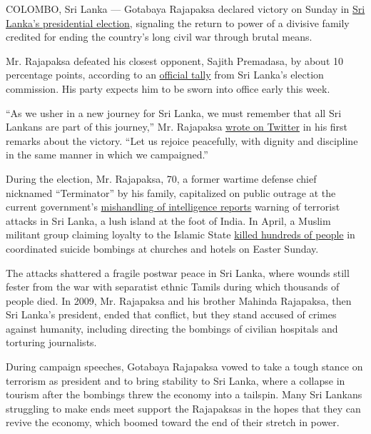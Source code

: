 COLOMBO, Sri Lanka --- Gotabaya Rajapaksa declared victory on Sunday in
\href{https://www.nytimes3xbfgragh.onion/2019/11/16/world/asia/sri-lanka-election-rajapaksa.html?rref=collection\%2Fbyline\%2Fkai-schultz\&action=click\&contentCollection=undefined\&region=stream\&module=stream_unit\&version=latest\&contentPlacement=1\&pgtype=collection}{Sri
Lanka's presidential election}, signaling the return to power of a
divisive family credited for ending the country's long civil war through
brutal means.

Mr. Rajapaksa defeated his closest opponent, Sajith Premadasa, by about
10 percentage points, according to an
\href{https://twitter.com/AzzamAmeen/status/1196016908446752768}{official
tally} from Sri Lanka's election commission. His party expects him to be
sworn into office early this week.

``As we usher in a new journey for Sri Lanka, we must remember that all
Sri Lankans are part of this journey,'' Mr. Rajapaksa
\href{https://twitter.com/GotabayaR/status/1195949575166521346}{wrote on
Twitter} in his first remarks about the victory. ``Let us rejoice
peacefully, with dignity and discipline in the same manner in which we
campaigned.''

During the election, Mr. Rajapaksa, 70, a former wartime defense chief
nicknamed ``Terminator'' by his family, capitalized on public outrage at
the current government's
\href{https://www.nytimes3xbfgragh.onion/2019/04/22/world/asia/ntj-warning-sri-lanka-government.html?action=click\&module=RelatedLinks\&pgtype=Article}{mishandling
of intelligence reports} warning of terrorist attacks in Sri Lanka, a
lush island at the foot of India. In April, a Muslim militant group
claiming loyalty to the Islamic State
\href{https://www.nytimes3xbfgragh.onion/2019/04/21/world/asia/sri-lanka-bombings.html?rref=collection\%2Fbyline\%2Fkai-schultz\&module=inline}{killed
hundreds of people} in coordinated suicide bombings at churches and
hotels on Easter Sunday.

The attacks shattered a fragile postwar peace in Sri Lanka, where wounds
still fester from the war with separatist ethnic Tamils during which
thousands of people died. In 2009, Mr. Rajapaksa and his brother Mahinda
Rajapaksa, then Sri Lanka's president, ended that conflict, but they
stand accused of crimes against humanity, including directing the
bombings of civilian hospitals and torturing journalists.

During campaign speeches, Gotabaya Rajapaksa vowed to take a tough
stance on terrorism as president and to bring stability to Sri Lanka,
where a collapse in tourism after the bombings threw the economy into a
tailspin. Many Sri Lankans struggling to make ends meet support the
Rajapaksas in the hopes that they can revive the economy, which boomed
toward the end of their stretch in power.

